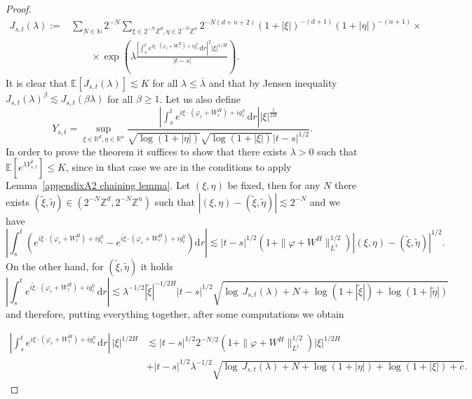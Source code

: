 \documentclass[10pt]{article}
\newcommand{\assign}{:=}
\newcommand{\mathd}{\mathrm{d}}
\begin{document}
\begin{proof}
  \begin{align}
    J_{s, t} (\lambda) \assign & \sum_{N \in \mathbb{N}} 2^{- N} \sum_{\xi \in
    2^{- N} \mathbb{Z}^d, \eta \in 2^{- N} \mathbb{Z}^n} 2^{- N (d + n + 2)}
    (1 + | \xi |)^{- (d + 1)} (1 + | \eta |)^{- (n + 1)} \times \nonumber\\
    & \qquad \times \exp \left( \lambda \frac{\left| \int_s^t e^{i \xi \cdot
    (\varphi_r + W^H_r) + i g^{\eta}_r} \, \mathd r \right|^2 | \xi |^{1 /
    H}}{| t - s |} \right) . \nonumber
  \end{align}
%  
  It is clear that $\mathbb{E} [J_{s, t} (\lambda)] \lesssim K$ for all
  $\lambda \leqslant \overline{\lambda}$ and that by Jensen inequality $J_{s,
  t} (\lambda)^{\beta} \lesssim J_{s, t} (\beta \lambda)$ for all $\beta
  \geqslant 1$. Let us also define
  \[ Y_{s, t} = \sup_{\xi \in \mathbb{R}^d, \eta \in \mathbb{R}^n}
     \frac{\left| \int_s^t e^{i \xi \cdot (\varphi_r + W^H_r) + i g^{\eta}_r}
     \, \mathd r \right| | \xi |^{\frac{1}{2 H}}}{\sqrt{\log (1 + | \eta |)} 
     \sqrt{\log (1 + | \xi |)} | t - s |^{1 / 2}}  . \]
  In order to prove the theorem it suffices to show that there exists $\lambda
  > 0$ such that $\mathbb{E} [e^{\lambda Y_{s, t}^2}] \leqslant K$, since in
  that case we are in the conditions to apply Lemma~\ref{appendixA2 chaining
  lemma}. Let $(\xi, \eta)$ be fixed, then for any $N$ there exists
  $(\tilde{\xi}, \tilde{\eta}) \in (2^{- N} \mathbb{Z}^d, 2^{-N} \mathbb{Z}^n)$ such that $| (\xi, \eta) -
  (\tilde{\xi}, \tilde{\eta}) | \lesssim 2^{- N}$ and we have
  \[ \left| \int_s^t (e^{i \xi \cdot (\varphi_r + W^H_r) + i g^{\eta}_r} -
     e^{i \tilde{\xi} \cdot (\varphi_r + W^H_r) + i g^{\tilde{\eta}}_r})
     \mathd r \right| \lesssim | t - s |^{1 / 2} (1 + \| \varphi + W^H \|^{1 /
     2}_{L^1}) | (\xi, \eta) - (\tilde{\xi}, \tilde{\eta}) |^{1 / 2} . \]
  On the other hand, for $(\tilde{\xi}, \tilde{\eta})$ it holds
  \[ \left| \int_s^t e^{i \tilde{\xi} \cdot (\varphi_r + W^H_r) + i
     g^{\tilde{\eta}}_r} \, \mathd r \right| \lesssim \lambda^{- 1 / 2} |
     \tilde{\xi} |^{- 1 / 2 H} | t - s |^{1 / 2} \sqrt{\log \, J_{s, t}
     (\lambda) + N + \log (1 + | \tilde{\xi} |) + \log (1 + | \tilde{\eta} |)}
  \]
  and therefore, putting everything together, after some computations we
  obtain
  
  \begin{align*}
    \left| \int_s^t e^{i \xi \cdot (\varphi_r + W^H_r) + i g^{\eta}_r} \,
    \mathd r \right| \, | \xi |^{1 / 2 H} & \lesssim | t - s |^{1 / 2} 2^{- N
    / 2} (1 + \| \varphi + W^H \|^{1 / 2}_{L^1}) | \xi |^{1 / 2 H}\\
    & + | t - s |^{1 / 2} \lambda^{- 1 / 2} \sqrt{\log \, J_{s, t} (\lambda)
    + N + \log (1 + | \eta |) + \log (1 + | \xi |) + c} .
  \end{align*}
  

\end{proof}
\end{document}
